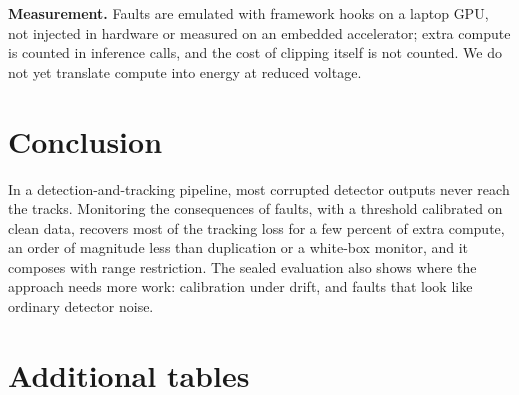 \documentclass[11pt]{article}
\begin{document}
\textbf{Measurement.} Faults are emulated with framework hooks on a laptop GPU, not injected in hardware or measured on an embedded accelerator; extra compute is counted in inference calls, and the cost of clipping itself is not counted. We do not yet translate compute into energy at reduced voltage.

\section{Conclusion}

In a detection-and-tracking pipeline, most corrupted detector outputs never reach the tracks. Monitoring the consequences of faults, with a threshold calibrated on clean data, recovers most of the tracking loss for a few percent of extra compute, an order of magnitude less than duplication or a white-box monitor, and it composes with range restriction. The sealed evaluation also shows where the approach needs more work: calibration under drift, and faults that look like ordinary detector noise.

\appendix
\section{Additional tables}

\begin{table}[h]
\centering\small
\caption{Bit model 'all' (flipped bit uniform over 16 bits), one fault per inference: HOTA loss recovered / extra compute.}
\label{tab:allbit}
\resizebox{0.85\linewidth}{!}{}
\end{table}

\begin{table}[h]
\centering\small
\caption{Development (q2) versus sealed test, combined monitor at $\alpha=1\%$. The development false alarm rate is in-sample for the threshold by construction.}
\label{tab:devtest}
\resizebox{\linewidth}{!}{}
\end{table}



\end{document}
